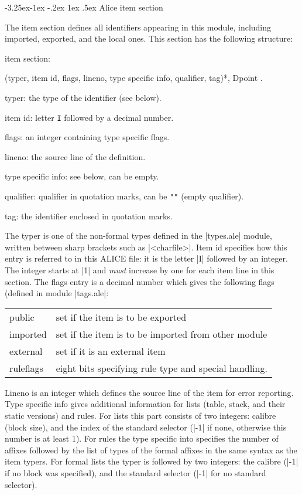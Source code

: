 \documentclass[titlepage]{article}
\makeatletter
\newcommand\I{\textsf{ALICE}}
\newenvironment{grammar}{%
\begin{list}{}{%
\setlength\leftmargin{18pt}%
\setlength\rightmargin{-5pt}%
\setlength\listparindent{20pt}%
\setlength\itemsep{1pt plus0.2ex}%
\setlength\parsep{0pt plus 2pt}%
\setlength\labelsep{-5pt}%
}\color{blue!90!black}\sf\mkoptions%
}{\end{list}}
\newcommand\g[1]{\textsf{\color{blue!90!black}#1}}
\def\remark#1{{\normalfont #1}}
\renewcommand\subsection{%
\@startsection{subsection}{2}{\z@}%
   {-3.25ex\@plus -1ex \@minus -.2ex}%
   {1ex \@plus .5ex}%
   {\normalfont\normalsize\bfseries}}
\makeatother
\begin{document}
\subsection{Alice item section}\label{alice:item}

The \g{item section} defines all identifiers appearing in this module,
including imported, exported, and the local ones. This section has the
following structure:
\begin{grammar}
\item item section: 

  (typer, item id, flags, lineno, type specific info, qualifier, tag)*, Dpoint .
\item typer: \remark{the type of the identifier (see below)}.
\item item id: \remark{letter {\tt I} followed by a decimal number}.
\item flags: \remark{an integer containing type specific flags}.
\item lineno: \remark{the source line of the definition}.
\item type specific info: \remark{see below, can be empty}.
\item qualifier: \remark{qualifier in quotation marks, can be {\tt""} (empty
qualifier)}.
\item tag: \remark{the identifier enclosed in quotation marks}.
\end{grammar}

\noindent
The \g{typer} is one of the non-formal types defined in the \pp|types.ale|
module, written between sharp brackets such as \pp|<charfile>|. \g{Item id}
specifies how this entry is referred to in this \I{} file: it is 
the letter \pp|I| followed by an integer. The integer starts at \pp|1| and
\emph{must} increase by one for each item line in this section.
%
The \g{flags} entry is a decimal number which gives the following flags
(defined in module \pp|tags.ale|:
\begin{center}\begin{tabular}{ll}
\g{public} & set if the item is to be exported \\
\g{imported}& set if the item is to be imported from other module \\
\g{external}& set if it is an external item \\
\g{ruleflags}& eight bits specifying rule type and special handling.
\end{tabular}\end{center}

\g{Lineno} is an integer which defines the source line of the item for error
reporting. \g{Type specific info} gives additional information for lists
(\g{table}, \g{stack}, and their static versions) and \g{rule}s. For lists this
part consists of two integers: calibre (block size), and the index of the
standard selector (\pp|-1| if none, otherwise this number is at least 1).
For rules the \g{type specific into} specifies the number of affixes
followed by the list of types of the formal affixes in the same syntax as
the item \g{typer}s. For formal lists the typer is followed by two integers:
the calibre (\pp|-1| if no block was specified), and the standard selector
(\pp|-1| for no standard selector).
\end{document}
